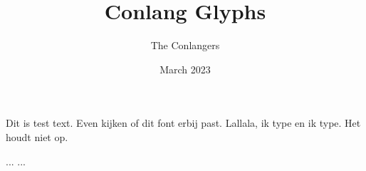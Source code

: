 \documentclass[12pt]{article}
\title{Conlang Glyphs}
\author{The Conlangers}
\date{March 2023}
\begin{document}
\maketitle
\def\thickness{15pt}

\thispagestyle{empty}



%


\large Dit is test text. Even kijken of dit font erbij past. Lallala, ik type en ik type. Het houdt niet op. 
\DeclareLetter{\LV}{\CH}
\DeclareLetter{\LV}{\TopHorizontal}
\DeclareLetter{\RightVertical}{\TopHorizontal}
\DeclareLetter{\BottomHorizontal}{\CenterVertical}
\DeclareLetter{\BottomHorizontal}{\RightVertical}
\DeclareLetter{\BottomHorizontal}{\RightVertical}
\DeclareLetter{\BottomHorizontal}{\LeftVertical}
\DeclareLetter{\LeftVertical}{\CenterHorizontal}
\DeclareLetter{\RightVertical}{\CenterHorizontal}
\DeclareLetter{\CenterVertical}{\CenterHorizontal}


\DeclareLetter{\RightCenterDiagonal}{\TopHorizontal}
\DeclareLetter{\RightCenterDiagonal}{\LeftTopHorizontal}
\DeclareLetter{\RightCenterDiagonal}{\LeftCenterHorizontal}
\DeclareLetter{\RightCenterDiagonal}{\LeftBottomHorizontal}
\DeclareLetter{\RightCenterDiagonal}{\BottomHorizontal}
\DeclareLetter{\RightCenterDiagonal}{\RightCenterHorizontal}
\DeclareLetter{\RightCenterDiagonal}{\RightTopHorizontal}
\DeclareLetter{\RightCenterDiagonal}{\CenterHorizontal}


\DeclareLetter{\LeftCenterDiagonal}{\TopHorizontal}
\DeclareLetter{\LeftCenterDiagonal}{\RightTopHorizontal}
\DeclareLetter{\LeftCenterDiagonal}{\RightCenterHorizontal}
\DeclareLetter{\LeftCenterDiagonal}{\RightBottomHorizontal}
\DeclareLetter{\LeftCenterDiagonal}{\BottomHorizontal}
\DeclareLetter{\LeftCenterDiagonal}{\LeftCenterHorizontal}
\DeclareLetter{\LeftCenterDiagonal}{\LeftTopHorizontal}
\DeclareLetter{\LeftCenterDiagonal}{\CenterHorizontal}

\DeclareLetter{\ArchBottomRight}{\UpperHorizontal}
\DeclareLetter{\ArchBottomRight}{\QRightUpperHorizontal}
\DeclareLetter{\ArchBottomRight}{\LeftLowerHorizontal}
\DeclareLetter{\ArchBottomRight}{\RightLeftBottomHorizontal}
\DeclareLetter{\ArchBottomRight}{\BottomHorizontal}
\DeclareLetter{\ArchBottomRight}{\LeftRightBottomHorizontal}
\DeclareLetter{\ArchBottomRight}{\LeftLowerHorizontal}
\DeclareLetter{\ArchBottomRight}{\OuterRightUpperHorizontal}
\DeclareLetter{\ArchBottomRight}{\CenterHorizontal}
...
...
\end{document}
